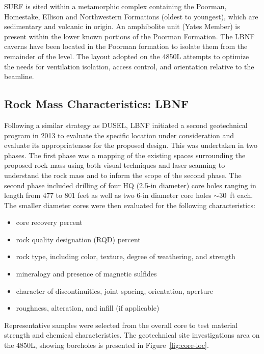SURF is sited within a metamorphic complex containing the Poorman, Homestake, Ellison and Northwestern Formations (oldest to youngest), which are sedimentary and volcanic in origin. An amphibolite unit (Yates Member) is present within the lower known portions of the Poorman Formation. The LBNF %
caverns have been located in the Poorman formation to isolate them from the remainder of the level. The layout adopted on the 4850L attempts to optimize the needs for ventilation isolation, access control, and orientation relative to the beamline.

\subsection{Rock Mass Characteristics: LBNF}
\label{sec:fscf-site-cond-geo-rock}

Following a similar strategy as DUSEL, LBNF initiated a second geotechnical program in 2013 to evaluate the specific location under consideration and evaluate its appropriateness for the proposed design.  This was undertaken in two phases.  The first phase was a mapping of the existing spaces surrounding the proposed rock mass using both visual techniques and laser scanning to understand the rock mass and to inform the scope of the second phase.  The second phase included drilling of four HQ (2.5-in diameter) core holes ranging in length from 477 to 801 feet as well as two 6-in diameter core holes $\sim$30~ft each.  The smaller diameter cores were then evaluated for the following characteristics:

\begin{itemize}
 \item core recovery percent
 \item rock quality designation (RQD) percent
 \item rock type, including color, texture, degree of weathering, and strength
 \item mineralogy and presence of magnetic sulfides
 \item character of discontinuities, joint spacing, orientation, aperture
 \item roughness, alteration, and infill (if applicable)
\end{itemize}

Representative samples were selected from the overall core to test material strength and chemical characteristics. The geotechnical site investigations area on the 4850L, showing boreholes is presented in Figure~\ref{fig:core-loc}. 

